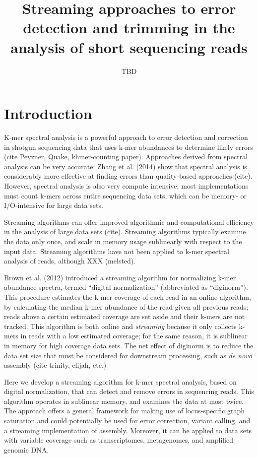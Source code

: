 \documentclass{article}
\begin{document}
\title{Streaming approaches to error detection and trimming in the analysis of
short sequencing reads}
\author{TBD}
\maketitle

\section{Introduction}

K-mer spectral analysis is a powerful approach to error detection and
correction in shotgun sequencing data that uses k-mer abundances to
determine likely errors (cite Pevzner, Quake, khmer-counting paper).
Approaches derived from spectral analysis can be very accurate: Zhang
et al. (2014) show that spectral analysis is considerably more
effective at finding errors than quality-based approaches (cite).  However,
spectral analysis is also very compute intensive; most implementations
must count k-mers across entire sequencing data sets, which can be
memory- or I/O-intensive for large data sets.

Streaming algorithms can offer improved algorithmic and computational
efficiency in the analysis of large data sets (cite).  Streaming
algorithms typically examine the data only once, and scale in memory
usage sublinearly with respect to the input data.  Streaming
algorithms have not been applied to k-mer spectral analysis of reads,
although XXX (melsted).

Brown et al. (2012) introduced a streaming algorithm for normalizing
k-mer abundance spectra, termed ``digital normalization'' (abbreviated
as ``diginorm'').  This procedure estimates the k-mer coverage of each
read in an online algorithm, by calculating the median k-mer abundance
of the read given all previous reads; reads above a certain estimated
coverage are set aside and their k-mers are not tracked.  This
algorithm is both online and {\em streaming} because it only collects
k-mers in reads with a low estimated coverage; for the same reason, it
is sublinear in memory for high coverage data sets.  The net effect of
diginorm is to reduce the data set size that must be considered for
downstream processing, such as {\em de novo} assembly (cite trinity,
elijah, etc.)

Here we develop a streaming algorithm for k-mer spectral analysis,
based on digital normalization, that can detect and remove errors in
sequencing reads.  This algorithm operates in sublinear memory, and
examines the data at most twice.  The approach offers a general
framework for making use of locus-specific graph saturation and could
potentially be used for error correction, variant calling, and a
streaming implementation of assembly.  Moreover, it can be applied to
data sets with variable coverage such as transcriptomes, metagenomes,
and amplified genomic DNA.
\end{document}
